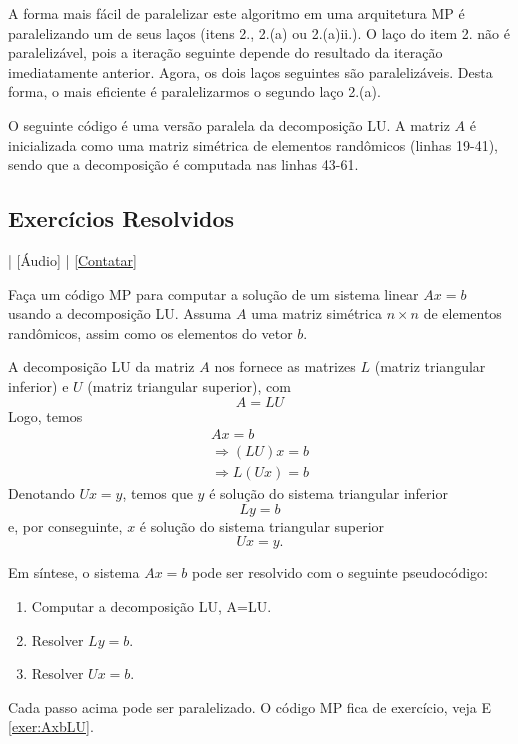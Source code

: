 A forma mais fácil de paralelizar este algoritmo em uma arquitetura MP é paralelizando um de seus laços (itens 2., 2.(a) ou 2.(a)ii.). O laço do item 2. não é paralelizável, pois a iteração seguinte depende do resultado da iteração imediatamente anterior. Agora, os dois laços seguintes são paralelizáveis. Desta forma, o mais eficiente é paralelizarmos o segundo laço 2.(a).

O seguinte código é uma versão paralela da decomposição LU. A matriz $A$ é inicializada como uma matriz simétrica de elementos randômicos (linhas 19-41), sendo que a decomposição é computada nas linhas 43-61.



\subsection*{Exercícios Resolvidos}

\begin{flushright}
  [Vídeo] | [Áudio] | \href{https://phkonzen.github.io/notas/contato.html}{[Contatar]}
\end{flushright}

\begin{exeresol}\label{exeresol:AxbLU}
  Faça um código MP para computar a solução de um sistema linear $Ax=b$ usando a decomposição LU. Assuma $A$ uma matriz simétrica $n\times n$ de elementos randômicos, assim como os elementos do vetor $b$.
\end{exeresol}
\begin{resol}
  A decomposição LU da matriz $A$ nos fornece as matrizes $L$ (matriz triangular inferior) e $U$ (matriz triangular superior), com
  \begin{equation}
    A = LU
  \end{equation}
  Logo, temos
  \begin{gather}
    Ax = b\\
    \Rightarrow (LU)x = b\\
    \Rightarrow L(Ux)=b
  \end{gather}
  Denotando $Ux = y$, temos que $y$ é solução do sistema triangular inferior
  \begin{equation}
    Ly = b
  \end{equation}
  e, por conseguinte, $x$ é solução do sistema triangular superior
  \begin{equation}
    Ux = y.
  \end{equation}

  Em síntese, o sistema $Ax=b$ pode ser resolvido com o seguinte pseudocódigo:
  \begin{enumerate}
  \item Computar a decomposição LU, A=LU.
  \item Resolver $Ly = b$.
  \item Resolver $Ux = b$.
  \end{enumerate}
  Cada passo acima pode ser paralelizado. O código MP fica de exercício, veja E \ref{exer:AxbLU}.  
\end{resol}

